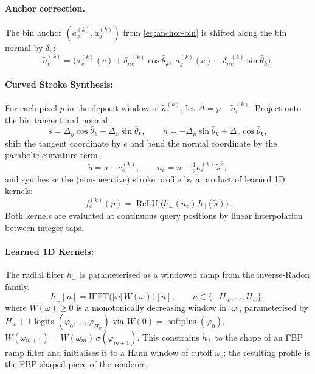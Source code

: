 \documentclass[11pt,a4paper]{article}
\newcommand{\abs}[1]{\left\lvert#1\right\rvert}
\newcommand{\softplus}{\operatorname{softplus}}
\newcommand{\relu}{\operatorname{ReLU}}
\begin{document}
\paragraph{Anchor correction.}
The bin anchor $(a_x^{(k)}, a_y^{(k)})$ from \cref{eq:anchor-bin} is shifted along the bin normal by $\delta_n$:
\begin{equation}\label{eq:anchor-shift}
  \tilde a^{(k)}_c = \bigl(a_x^{(k)}(c) + \delta_{n}{}^{(k)}_c \cos\bar\theta_k,\;
                            a_y^{(k)}(c) - \delta_{n}{}^{(k)}_c \sin\bar\theta_k\bigr).
\end{equation}

\paragraph{Curved Stroke Synthesis:}
For each pixel $p$ in the deposit window of $\tilde a^{(k)}_c$, let $\Delta = p - \tilde a^{(k)}_c$. Project onto the bin tangent and normal,
\begin{equation}\label{eq:proj}
  s = \Delta_y \cos\bar\theta_k + \Delta_x \sin\bar\theta_k,
  \qquad
  n = -\Delta_y \sin\bar\theta_k + \Delta_x \cos\bar\theta_k,
\end{equation}
shift the tangent coordinate by $e$ and bend the normal coordinate by the parabolic curvature term,
\begin{equation}\label{eq:bend}
  \tilde s = s - e^{(k)}_c, \qquad n_c = n - \tfrac{1}{2}\kappa^{(k)}_c\, \tilde s^{2},
\end{equation}
and synthesise the (non-negative) stroke profile by a product of learned 1D kernels:
\begin{equation}\label{eq:f}
  f^{(k)}_c(p) = \relu\!\bigl(h_{\perp}(n_c)\, h_{\parallel}(\tilde s)\bigr).
\end{equation}
Both kernels are evaluated at continuous query positions by linear interpolation between integer taps.

\paragraph{Learned 1D Kernels:}
The radial filter $h_{\perp}$ is parameterised as a windowed ramp from the inverse-Radon family,
\begin{equation}\label{eq:h-perp}
  h_{\perp}[n] = \mathrm{IFFT}\bigl(\abs{\omega}\, W(\omega)\bigr)[n],
  \qquad n \in \{-H_w, \dots, H_w\},
\end{equation}
where $W(\omega) \geq 0$ is a monotonically decreasing window in $\abs{\omega}$, parameterised by $H_w + 1$ logits $(\varphi_0, \dots, \varphi_{H_w})$ via
$W(0) = \softplus(\varphi_0)$, $W(\omega_{m+1}) = W(\omega_m)\,\sigma(\varphi_{m+1})$.
This constrains $h_{\perp}$ to the shape of an FBP ramp filter and initialises it to a Hann window of cutoff $\omega_c$; the resulting profile is the FBP-shaped piece of the renderer.
\end{document}
